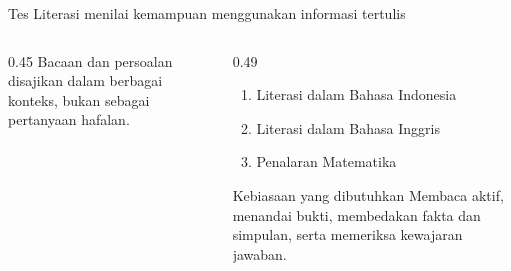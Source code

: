 \begin{frame}{Tes Literasi menilai kemampuan menggunakan informasi tertulis}
  \begin{columns}[T,onlytextwidth]
    \begin{column}{0.45\textwidth}
      \vspace{0.20cm}
      {\fontsize{11.8}{14.8}\selectfont Bacaan dan persoalan disajikan dalam berbagai konteks, bukan sebagai pertanyaan hafalan.}
    \end{column}
    \begin{column}{0.49\textwidth}
      \begin{enumerate}
        \item Literasi dalam Bahasa Indonesia
        \item Literasi dalam Bahasa Inggris
        \item Penalaran Matematika
      \end{enumerate}
      \vspace{0.22cm}
      \begin{block}{Kebiasaan yang dibutuhkan}
        Membaca aktif, menandai bukti, membedakan fakta dan simpulan, serta memeriksa kewajaran jawaban.
      \end{block}
    \end{column}
  \end{columns}
\end{frame}

